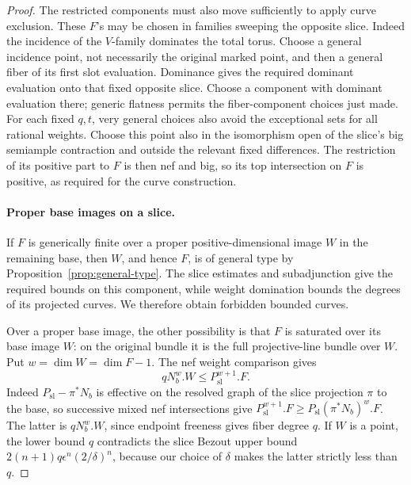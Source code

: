 \begin{proof}
The restricted components must also move sufficiently to apply curve
exclusion.  These \(F\)'s may be chosen in families sweeping the opposite
slice.  Indeed the incidence of the \(V\)-family dominates the
total torus.  Choose a general incidence point, not necessarily
the original marked point, and then a general fiber of its first
slot evaluation.  Dominance gives the required dominant evaluation
onto that fixed opposite slice. Choose a component with dominant
evaluation there; generic flatness permits the fiber-component choices
just made. For each fixed \(q,t\), very general choices
also avoid the exceptional sets for all rational weights.
Choose this point also in the isomorphism open of the slice's big
semiample contraction and outside the relevant fixed differences.
The restriction of its positive part to \(F\) is then nef and big,
so its top intersection on \(F\) is positive, as required for the
curve construction.

\paragraph{Proper base images on a slice.}
If \(F\) is generically finite over a proper positive-dimensional
image \(W\) in the remaining base, then \(W\), and hence \(F\), is
of general type by Proposition~\ref{prop:general-type}.
The slice estimates and subadjunction give the required bounds on
this component, while weight domination bounds the degrees of its
projected curves.  We therefore obtain forbidden bounded curves.

Over a proper base image, the other possibility is that \(F\) is
saturated over its base image \(W\): on the original bundle it is
the full projective-line bundle over \(W\).
Put \(w=\dim W=\dim F-1\).  The nef weight comparison gives
\begin{equation}\label{jet:saturated-degree}
 qN_b^w.W\le P_{\mathrm{sl}}^{w+1}.F.
\end{equation}
Indeed \(P_{\mathrm{sl}}-\pi^*N_b\) is effective on the resolved graph
of the slice projection \(\pi\) to the base, so
successive mixed nef intersections give
\(P_{\mathrm{sl}}^{w+1}.F\ge
P_{\mathrm{sl}}(\pi^*N_b)^w.F\). The latter is
\(qN_b^w.W\), since endpoint freeness gives fiber degree \(q\).
If \(W\) is a point, the lower bound \(q\) contradicts the slice
Bezout upper bound \(2(n+1)q\epsilon^n(2/\delta)^n\), because our
choice of \(\delta\) makes the latter strictly less than \(q\).


\end{proof}
